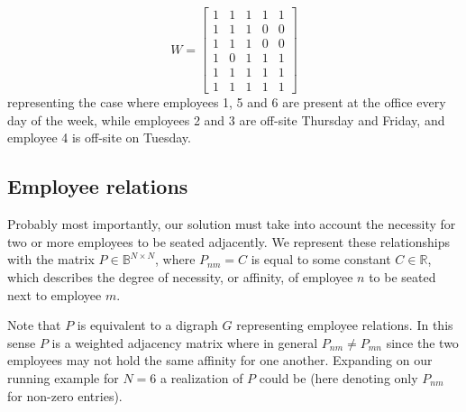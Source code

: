 \documentclass[10pt]{article}
\theoremstyle{definition}
\theoremstyle{plain}
\theoremstyle{remark}
\begin{document}
	\begin{equation}
		W = \begin{bmatrix}
			1 & 1 & 1 & 1 & 1 \\
			1 & 1 & 1 & 0 & 0 \\
			1 & 1 & 1 & 0 & 0 \\
			1 & 0 & 1 & 1 & 1 \\
			1 & 1 & 1 & 1 & 1 \\
			1 & 1 & 1 & 1 & 1 
		\end{bmatrix}
	\end{equation}
	representing the case where employees 1, 5 and 6 are present at the office every day of the week, while employees 2 and 3 are off-site Thursday and Friday, and employee 4 is off-site on Tuesday.
	
	\subsection{Employee relations}
	Probably most importantly, our solution must take into account the necessity for two or more employees to be seated adjacently. We represent these relationships with the matrix $P\in\mathbb{B}^{N\times N}$, where $P_{nm} = C$ is equal to some constant $C\in\mathbb{R}$, which describes the degree of necessity, or affinity, of employee $n$ to be seated next to employee $m$. 
	
	Note that $P$ is equivalent to a digraph $G$ representing employee relations. In this sense $P$ is a weighted adjacency matrix where in general $P_{nm} \neq P_{mn}$ since the two employees may not hold the same affinity for one another. 
	Expanding on our running example for $N = 6$ a realization of $P$ could be (here denoting only $P_{nm}$ for non-zero entries).
	
\end{document}
